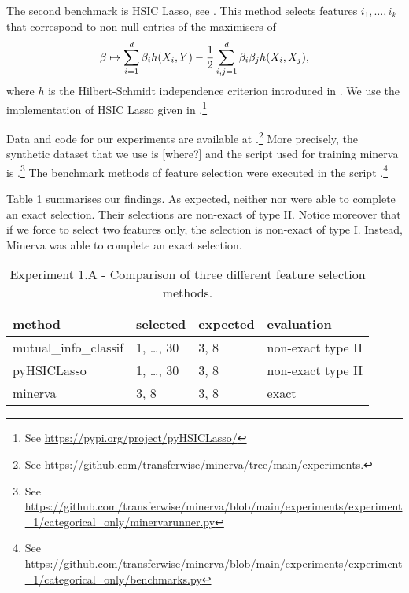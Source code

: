 The second benchmark is
HSIC Lasso,
see 
\cite{YJSXS14hig}.
This method 
selects features $i_1, \dots, i_k$
that correspond to non-null entries of the 
maximisers of 
\begin{equation*}
	\beta \mapsto 
	\sum_{i=1}^{d} \beta_i h(X_i, Y)
	-\frac{1}{2}
	\sum_{i,j = 1}^{d} \beta_i \beta_j h(X_i, X_j),
\end{equation*}
where $h$ is the Hilbert-Schmidt independence criterion 
introduced in 
\cite{GBSS05mea}.
We use the implementation of HSIC Lasso
given in
.\footnote{
See \url{https://pypi.org/project/pyHSICLasso/}
}

Data and code for our experiments are available 
at
.\footnote{
	See
\url{https://github.com/transferwise/minerva/tree/main/experiments}. 
}
More precisely, 
the synthetic dataset that we use is
 [where?]
and 
the script used for training minerva is
.\footnote{
	See
\url{https://github.com/transferwise/minerva/blob/main/experiments/experiment\_1/categorical\_only/minervarunner.py}
}
The benchmark methods of feature selection 
were
executed
in the script
.\footnote{
	See
\url{https://github.com/transferwise/minerva/blob/main/experiments/experiment\_1/categorical\_only/benchmarks.py}
}


Table
\ref{tab.experiment1A}
summarises our findings. 
As expected, 
neither 
nor
were able to complete an exact selection. 
Their selections are non-exact of type II. 
Notice moreover that if we force 
to select two features only,
the selection is non-exact of type I.
Instead,
Minerva
was able to complete an exact selection.

\begin{table}
	\centering
{
	\begin{tabular}{l|l|l|l}
		\textbf{method}
		&
		\textbf{selected}
		&
		\textbf{expected}
		&
		\textbf{evaluation}
		\\
		\hline
		mutual\_info\_classif
		&
		1, \dots, 30
		& 
		3, 8
		&
		non-exact type II
		\\
		pyHSICLasso
		&
		1, \dots, 30
		& 
		3, 8
		&
		non-exact type II
		\\
		minerva
		& 
		3, 8
		&
		3, 8
		&
		exact
	\end{tabular}
}
\caption{Experiment 1.A - Comparison of three different feature selection methods.}
\label{tab.experiment1A}
\end{table}






